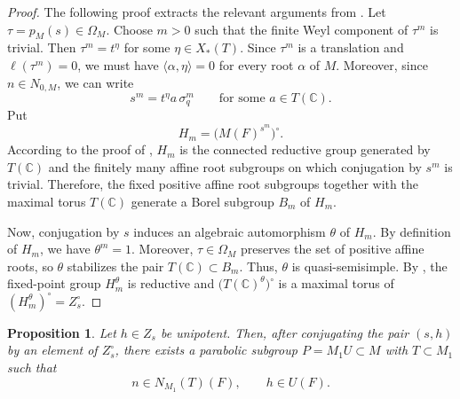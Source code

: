 \documentclass[11pt]{amsart}
\numberwithin{equation}{section}
\newtheorem{proposition}[proposition]{Proposition}
\theoremstyle{definition}
\theoremstyle{remark}
\begin{document}
\begin{proof}
The following proof extracts the relevant arguments from \cite[Lemma~4.1]{NZ}.
Let $\tau=p_M(s)\in\Omega_M$.  Choose $m>0$ such that the finite Weyl
component of $\tau^m$ is trivial.  Then $\tau^m=t^\eta$ for some
$\eta\in X_*(T)$.  Since $\tau^m$ is a translation and $\ell(\tau^m)=0$, we must have 
$\langle\alpha,\eta\rangle=0$ for every root $\alpha$ of $M$. Moreover, since
$n\in N_{0,M}$, we can write
\[
  s^m=t^\eta a\,\sigma_q^m
  \qquad\text{for some }a\in T(\mathbb C).
\]
Put
\[
  H_m=\bigl(M(F)^{s^m}\bigr)^\circ.
\]
According to the proof of \cite[Lemma~4.1]{NZ}, $H_m$ is the
connected reductive group generated by $T(\mathbb C)$ and the finitely many
affine root subgroups on which conjugation by $s^m$ is trivial. Therefore, the fixed positive affine root subgroups together with the maximal torus $T(\mathbb C)$ generate a Borel subgroup
$B_m$ of $H_m$.

Now, conjugation by $s$ induces an algebraic automorphism $\theta$ of $H_m$.
By definition of $H_m$, we have $\theta^m=1$.  Moreover,
$\tau\in\Omega_M$ preserves the set of positive affine roots, so $\theta$
stabilizes the pair $T(\mathbb C)\subset B_m$.  Thus, $\theta$ is
quasi-semisimple. By \cite[Proposition~2.1]{DM}, the fixed-point group
$H_m^\theta$ is reductive and
$\bigl(T(\mathbb C)^\theta\bigr)^\circ$
is a maximal torus of $(H_m^\theta)^\circ=Z_s^\circ$.
\end{proof}
\begin{proposition}\label{prop:parabolic}
Let $h\in Z_s$ be unipotent. Then, after conjugating the pair $(s,h)$ by an
element of $Z_s^\circ$, there exists a parabolic subgroup $P=M_1U\subset M$
with $T\subset M_1$ such that
\[
  n\in N_{M_1}(T)(F),
  \qquad
  h\in U(F).
\]
\end{proposition}
\end{document}
